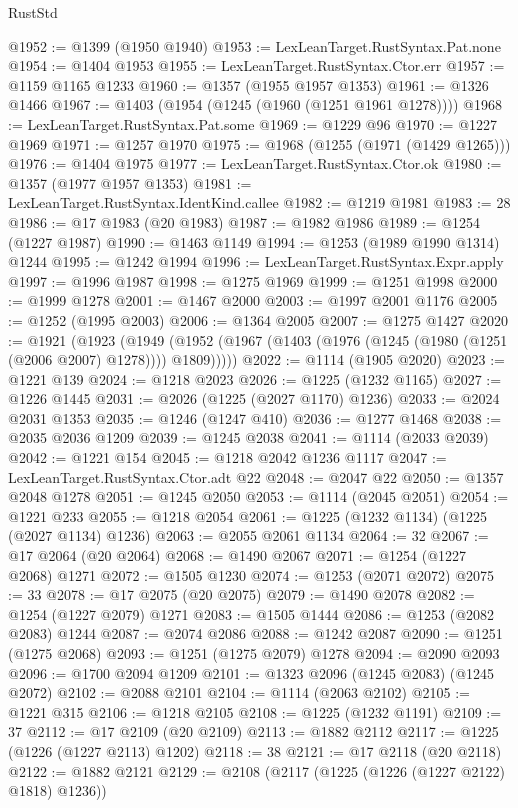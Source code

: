 \begin{lexlean}{RustStd}
\begin{coremodule}
@1952 := @1399 (@1950 @1940)
@1953 := LexLeanTarget.RustSyntax.Pat.none
@1954 := @1404 @1953
@1955 := LexLeanTarget.RustSyntax.Ctor.err
@1957 := @1159 @1165 @1233
@1960 := @1357 (@1955 @1957 @1353)
@1961 := @1326 @1466
@1967 := @1403 (@1954 (@1245 (@1960 (@1251 @1961 @1278))))
@1968 := LexLeanTarget.RustSyntax.Pat.some
@1969 := @1229 @96
@1970 := @1227 @1969
@1971 := @1257 @1970
@1975 := @1968 (@1255 (@1971 (@1429 @1265)))
@1976 := @1404 @1975
@1977 := LexLeanTarget.RustSyntax.Ctor.ok
@1980 := @1357 (@1977 @1957 @1353)
@1981 := LexLeanTarget.RustSyntax.IdentKind.callee
@1982 := @1219 @1981
@1983 := 28
@1986 := @17 @1983 (@20 @1983)
@1987 := @1982 @1986
@1989 := @1254 (@1227 @1987)
@1990 := @1463 @1149
@1994 := @1253 (@1989 @1990 @1314) @1244
@1995 := @1242 @1994
@1996 := LexLeanTarget.RustSyntax.Expr.apply
@1997 := @1996 @1987
@1998 := @1275 @1969
@1999 := @1251 @1998
@2000 := @1999 @1278
@2001 := @1467 @2000
@2003 := @1997 @2001 @1176
@2005 := @1252 (@1995 @2003)
@2006 := @1364 @2005
@2007 := @1275 @1427
@2020 := @1921
    (@1923
      (@1949 (@1952 (@1967 (@1403 (@1976 (@1245 (@1980 (@1251 (@2006 @2007) @1278)))) @1809)))))
@2022 := @1114 (@1905 @2020)
@2023 := @1221 @139
@2024 := @1218 @2023
@2026 := @1225 (@1232 @1165)
@2027 := @1226 @1445
@2031 := @2026 (@1225 (@2027 @1170) @1236)
@2033 := @2024 @2031 @1353
@2035 := @1246 (@1247 @410)
@2036 := @1277 @1468
@2038 := @2035 @2036 @1209
@2039 := @1245 @2038
@2041 := @1114 (@2033 @2039)
@2042 := @1221 @154
@2045 := @1218 @2042 @1236 @1117
@2047 := LexLeanTarget.RustSyntax.Ctor.adt @22
@2048 := @2047 @22
@2050 := @1357 @2048 @1278
@2051 := @1245 @2050
@2053 := @1114 (@2045 @2051)
@2054 := @1221 @233
@2055 := @1218 @2054
@2061 := @1225 (@1232 @1134) (@1225 (@2027 @1134) @1236)
@2063 := @2055 @2061 @1134
@2064 := 32
@2067 := @17 @2064 (@20 @2064)
@2068 := @1490 @2067
@2071 := @1254 (@1227 @2068) @1271
@2072 := @1505 @1230
@2074 := @1253 (@2071 @2072)
@2075 := 33
@2078 := @17 @2075 (@20 @2075)
@2079 := @1490 @2078
@2082 := @1254 (@1227 @2079) @1271
@2083 := @1505 @1444
@2086 := @1253 (@2082 @2083) @1244
@2087 := @2074 @2086
@2088 := @1242 @2087
@2090 := @1251 (@1275 @2068)
@2093 := @1251 (@1275 @2079) @1278
@2094 := @2090 @2093
@2096 := @1700 @2094 @1209
@2101 := @1323 @2096 (@1245 @2083) (@1245 @2072)
@2102 := @2088 @2101
@2104 := @1114 (@2063 @2102)
@2105 := @1221 @315
@2106 := @1218 @2105
@2108 := @1225 (@1232 @1191)
@2109 := 37
@2112 := @17 @2109 (@20 @2109)
@2113 := @1882 @2112
@2117 := @1225 (@1226 (@1227 @2113) @1202)
@2118 := 38
@2121 := @17 @2118 (@20 @2118)
@2122 := @1882 @2121
@2129 := @2108 (@2117 (@1225 (@1226 (@1227 @2122) @1818) @1236))

\end{coremodule}
\end{lexlean}
